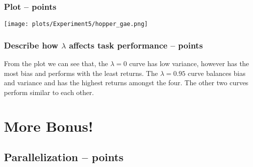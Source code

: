 \documentclass{article}
\begin{document}
\subsubsection{Plot --  points\rbrack}
\begin{answer}[title=Q8.1.2,height=10cm,width=\linewidth]
\centering
\texttt{[image: plots/Experiment5/hopper\_gae.png]}
\end{answer}

\subsubsection{Describe how $\lambda$ affects task performance --  points\rbrack}
\begin{answer}[title=Q8.1.3,height=4cm,width=\linewidth]
From the plot we can see that, the $\lambda = 0$ curve has low variance, however has the most bias and performs with the least returns.
The $\lambda = 0.95$ curve balances bias and variance and has the highest returns amongst the four. The other two curves perform similar to each other. 
\end{answer}

\clearpage

\section{More Bonus!}

\subsection{Parallelization --  points\rbrack}
\end{document}
